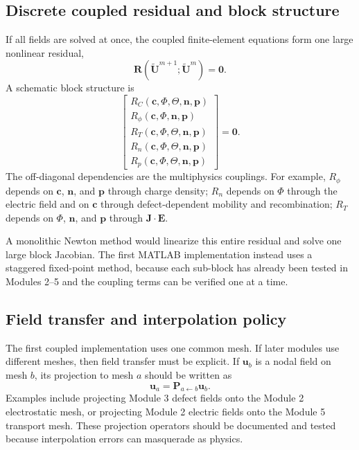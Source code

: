 \documentclass[11pt]{article}
\newcommand{\Evec}{\bm{E}}
\newcommand{\Jvec}{\bm{J}}
\newcommand{\Uvec}{\bm{U}}
\newcommand{\Rvec}{\bm{R}}
\begin{document}
\subsection{Discrete coupled residual and block structure}

If all fields are solved at once, the coupled finite-element equations form one large nonlinear residual,
\begin{equation}
\boxed{\Rvec(\widetilde{\Uvec}^{m+1};\widetilde{\Uvec}^{m})=\bm{0}.}
\end{equation}
A schematic block structure is
\begin{equation}
\begin{bmatrix}
R_C(\mathbf{c},\Phi,\Theta,\mathbf{n},\mathbf{p})\\
R_\phi(\mathbf{c},\Phi,\mathbf{n},\mathbf{p})\\
R_T(\mathbf{c},\Phi,\Theta,\mathbf{n},\mathbf{p})\\
R_n(\mathbf{c},\Phi,\Theta,\mathbf{n},\mathbf{p})\\
R_p(\mathbf{c},\Phi,\Theta,\mathbf{n},\mathbf{p})
\end{bmatrix}
=
\bm{0}.
\end{equation}
The off-diagonal dependencies are the multiphysics couplings. For example, \(R_\phi\) depends on \(\mathbf{c}\), \(\mathbf{n}\), and \(\mathbf{p}\) through charge density; \(R_n\) depends on \(\Phi\) through the electric field and on \(\mathbf{c}\) through defect-dependent mobility and recombination; \(R_T\) depends on \(\Phi\), \(\mathbf{n}\), and \(\mathbf{p}\) through \(\Jvec\cdot\Evec\).

A monolithic Newton method would linearize this entire residual and solve one large block Jacobian. The first MATLAB implementation instead uses a staggered fixed-point method, because each sub-block has already been tested in Modules 2--5 and the coupling terms can be verified one at a time.

\subsection{Field transfer and interpolation policy}

The first coupled implementation uses one common mesh. If later modules use different meshes, then field transfer must be explicit. If \(\mathbf{u}_b\) is a nodal field on mesh \(b\), its projection to mesh \(a\) should be written as
\begin{equation}
\boxed{\mathbf{u}_a=\mathbf{P}_{a\leftarrow b}\mathbf{u}_b.}
\end{equation}
Examples include projecting Module 3 defect fields onto the Module 2 electrostatic mesh, or projecting Module 2 electric fields onto the Module 5 transport mesh. These projection operators should be documented and tested because interpolation errors can masquerade as physics.
\end{document}

